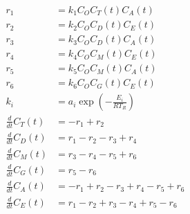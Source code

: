\begin{equation}
  \begin{aligned}
    r_{1}                & = k_{1}C_{O}C_{T}(t)C_{A}(t)
    \\
    r_{2}                & = k_{2}C_{O}C_{D}(t)C_{E}(t)
    \\
    r_{3}                & = k_{3}C_{O}C_{D}(t)C_{A}(t)
    \\
    r_{4}                & = k_{4}C_{O}C_{M}(t)C_{E}(t)
    \\
    r_{5}                & = k_{5}C_{O}C_{M}(t)C_{A}(t)
    \\
    r_{6}                & = k_{6}C_{O}C_{G}(t)C_{E}(t)
    \\
    k_{i}                & = a_{i} \exp(-\frac{E_{i}}{R T_{R}})
    \\
    \frac{d}{dt}C_{T}(t) & = - r_{1} + r_{2}
    \\
    \frac{d}{dt}C_{D}(t) & = r_{1} - r_{2} - r_{3} + r_{4}
    \\
    \frac{d}{dt}C_{M}(t) & = r_{3} - r_{4} - r_{5} + r_{6}
    \\
    \frac{d}{dt}C_{G}(t) & = r_{5} - r_{6}
    \\
    \frac{d}{dt}C_{A}(t) & = - r_{1} + r_{2} - r_{3} + r_{4} - r_{5} + r_{6}
    \\
    \frac{d}{dt}C_{E}(t) & = r_{1} - r_{2} + r_{3} - r_{4} + r_{5} - r_{6}
  \end{aligned}
  \label{eq:biodiesel02_1}
\end{equation}
